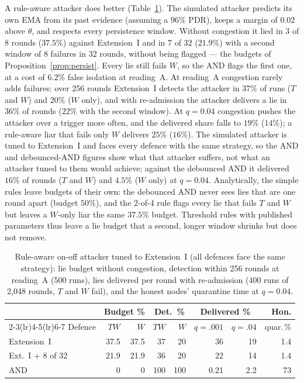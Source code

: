 \documentclass[lineno,pdflatex,sn-nature]{sn-jnl}
\theoremstyle{thmstyleone}%
\theoremstyle{thmstylethree}%
\begin{document}
A rule-aware attacker does better (Table~\ref{tab:aware}).  The
simulated attacker predicts its own EMA from its past evidence
(assuming a $96\%$ PDR), keeps a margin of $0.02$ above $\theta$, and
respects every persistence window.  Without congestion it lied in $3$ of
$8$ rounds ($37.5\%$) against Extension~I and in $7$ of $32$ ($21.9\%$)
with a second window of $8$ failures in $32$ rounds, without being
flagged --- the budgets of Proposition~\ref{prop:persist}.  Every lie
still fails $W$, so the AND flags the first one, at a cost of $6.2\%$
false isolation at reading~A.  At reading~A congestion rarely adds
failures: over 256 rounds Extension~I detects the attacker in $37\%$ of
runs ($T$ and $W$) and $20\%$ ($W$ only), and with re-admission the
attacker delivers a lie in $36\%$ of rounds ($22\%$ with the second
window).  At $q=0.04$ congestion pushes the attacker over a trigger more
often, and the delivered share falls to $19\%$ ($14\%$); a rule-aware
liar that fails only $W$ delivers $25\%$ ($16\%$).  The simulated
attacker is tuned to Extension~I and faces every defence with the
same strategy, so the AND and debounced-AND figures show what that
attacker suffers, not what an attacker tuned to them would achieve;
against the debounced AND it delivered $16\%$ of rounds ($T$ and $W$)
and $4.5\%$ ($W$ only) at $q=0.04$.  Analytically, the simple rules
leave budgets of their own: the debounced AND never sees lies that
are one round apart (budget $50\%$), and the 2-of-4 rule flags every
lie that fails $T$ and $W$ but leaves a $W$-only liar the same
$37.5\%$ budget.  Threshold rules with published parameters thus leave
a lie budget that a second, longer window shrinks but does not remove.

\begin{table}[!t]
\caption{Rule-aware on-off attacker tuned to Extension~I (all defences face the same strategy): lie budget without congestion, detection within 256 rounds at reading~A (500 runs), lies delivered per round with re-admission (400 runs of 2{,}048 rounds, $T$ and $W$ fail), and the honest nodes' quarantine time at $q=0.04$.}
\label{tab:aware}
\centering
\renewcommand{\arraystretch}{1.08}
\footnotesize
\setlength{\tabcolsep}{2.0pt}
\begin{tabular}{lrrrrrrr}
\toprule
 & \multicolumn{2}{c}{{Budget \%}} & \multicolumn{2}{c}{{Det.\ \%}} & \multicolumn{2}{c}{{Delivered \%}} & {Hon.} \\
\cmidrule(lr){2-3}\cmidrule(lr){4-5}\cmidrule(lr){6-7}
{Defence} & $TW$ & $W$ & $TW$ & $W$ & $q{=}.001$ & $q{=}.04$ & {quar.\,\%} \\
\midrule
{Extension~I} & 37.5 & 37.5 & 37 & 20 & 36 & 19 & 1.4 \\
Ext.~I + 8 of 32 & 21.9 & 21.9 & 36 & 20 & 22 & 14 & 1.4 \\
AND~\cite{soula2024iodt} & 0 & 0 & 100 & 100 & 0.21 & 2.2 & 73 \\
\bottomrule
\end{tabular}
\end{table}
\end{document}
